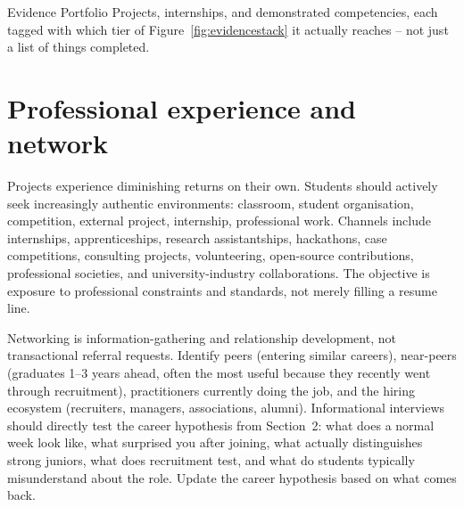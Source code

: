 \documentclass{reportkit}
\begin{document}
\begin{diagram}[
  type=stack,
  caption={The career evidence stack.},
  label={fig:evidencestack},
  source={Illustrative progression; ordering reflects persuasiveness to a recruiter, not a measured population.},
  description={Seven tiers rising from credential through measured impact, each narrower and rarer than the one below it.}
]
\end{diagram}

\begin{deliverablenote}{Evidence Portfolio}
Projects, internships, and demonstrated competencies, each tagged with which tier of
Figure~\ref{fig:evidencestack} it actually reaches -- not just a list of things
completed.
\end{deliverablenote}

\section{Professional experience and network}
Projects experience diminishing returns on their own. Students should actively seek
increasingly authentic environments: classroom, student organisation, competition,
external project, internship, professional work. Channels include internships,
apprenticeships, research assistantships, hackathons, case competitions, consulting
projects, volunteering, open-source contributions, professional societies, and
university-industry collaborations. The objective is exposure to professional
constraints and standards, not merely filling a resume line.

Networking is information-gathering and relationship development, not transactional
referral requests. Identify peers (entering similar careers), near-peers (graduates
1--3 years ahead, often the most useful because they recently went through
recruitment), practitioners currently doing the job, and the hiring ecosystem
(recruiters, managers, associations, alumni). Informational interviews should
directly test the career hypothesis from Section~2: what does a normal week look
like, what surprised you after joining, what actually distinguishes strong juniors,
what does recruitment test, and what do students typically misunderstand about the
role. Update the career hypothesis based on what comes back.
\end{document}
